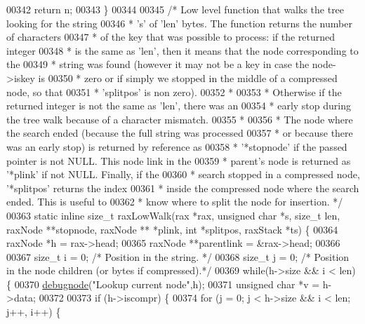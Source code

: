\begin{DoxyCode}
{{00342     \textcolor{keywordflow}{return} n;
00343 \}
00344 
00345 \textcolor{comment}{/* Low level function that walks the tree looking for the string}
00346 \textcolor{comment}{ * 's' of 'len' bytes. The function returns the number of characters}
00347 \textcolor{comment}{ * of the key that was possible to process: if the returned integer}
00348 \textcolor{comment}{ * is the same as 'len', then it means that the node corresponding to the}
00349 \textcolor{comment}{ * string was found (however it may not be a key in case the node->iskey is}
00350 \textcolor{comment}{ * zero or if simply we stopped in the middle of a compressed node, so that}
00351 \textcolor{comment}{ * 'splitpos' is non zero).}
00352 \textcolor{comment}{ *}
00353 \textcolor{comment}{ * Otherwise if the returned integer is not the same as 'len', there was an}
00354 \textcolor{comment}{ * early stop during the tree walk because of a character mismatch.}
00355 \textcolor{comment}{ *}
00356 \textcolor{comment}{ * The node where the search ended (because the full string was processed}
00357 \textcolor{comment}{ * or because there was an early stop) is returned by reference as}
00358 \textcolor{comment}{ * '*stopnode' if the passed pointer is not NULL. This node link in the}
00359 \textcolor{comment}{ * parent's node is returned as '*plink' if not NULL. Finally, if the}
00360 \textcolor{comment}{ * search stopped in a compressed node, '*splitpos' returns the index}
00361 \textcolor{comment}{ * inside the compressed node where the search ended. This is useful to}
00362 \textcolor{comment}{ * know where to split the node for insertion. */}
00363 \textcolor{keyword}{static} \textcolor{keyword}{inline} size\_t raxLowWalk(rax *rax, \textcolor{keywordtype}{unsigned} \textcolor{keywordtype}{char} *s, size\_t len, raxNode **stopnode, raxNode **
      *plink, \textcolor{keywordtype}{int} *splitpos, raxStack *ts) \{
00364     raxNode *h = rax->head;
00365     raxNode **parentlink = &rax->head;
00366 
00367     size\_t i = 0; \textcolor{comment}{/* Position in the string. */}
00368     size\_t j = 0; \textcolor{comment}{/* Position in the node children (or bytes if compressed).*/}
00369     \textcolor{keywordflow}{while}(h->size && i < len) \{
00370         \hyperlink{rax_8c_a622b73fbdc398cdbfa8cc1fb87283cb4}{debugnode}(\textcolor{stringliteral}{"Lookup current node"},h);
00371         \textcolor{keywordtype}{unsigned} \textcolor{keywordtype}{char} *v = h->data;
00372 
00373         \textcolor{keywordflow}{if} (h->iscompr) \{
00374             \textcolor{keywordflow}{for} (j = 0; j < h->size && i < len; j++, i++) \{
}}
\end{DoxyCode}
